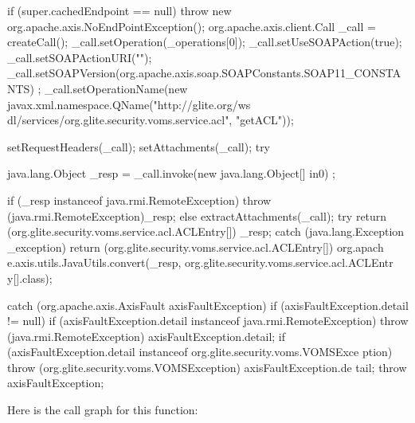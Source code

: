 \begin{DoxyCode}
                                                                                 
                                                                                   {
        if (super.cachedEndpoint == null) {
            throw new org.apache.axis.NoEndPointException();
        }
        org.apache.axis.client.Call _call = createCall();
        _call.setOperation(_operations[0]);
        _call.setUseSOAPAction(true);
        _call.setSOAPActionURI("");
        _call.setSOAPVersion(org.apache.axis.soap.SOAPConstants.SOAP11_CONSTANTS)
      ;
        _call.setOperationName(new javax.xml.namespace.QName("http://glite.org/ws
      dl/services/org.glite.security.voms.service.acl", "getACL"));

        setRequestHeaders(_call);
        setAttachments(_call);
 try {        java.lang.Object _resp = _call.invoke(new java.lang.Object[] {in0})
      ;

        if (_resp instanceof java.rmi.RemoteException) {
            throw (java.rmi.RemoteException)_resp;
        }
        else {
            extractAttachments(_call);
            try {
                return (org.glite.security.voms.service.acl.ACLEntry[]) _resp;
            } catch (java.lang.Exception _exception) {
                return (org.glite.security.voms.service.acl.ACLEntry[]) org.apach
      e.axis.utils.JavaUtils.convert(_resp, org.glite.security.voms.service.acl.ACLEntr
      y[].class);
            }
        }
  } catch (org.apache.axis.AxisFault axisFaultException) {
    if (axisFaultException.detail != null) {
        if (axisFaultException.detail instanceof java.rmi.RemoteException) {
              throw (java.rmi.RemoteException) axisFaultException.detail;
         }
        if (axisFaultException.detail instanceof org.glite.security.voms.VOMSExce
      ption) {
              throw (org.glite.security.voms.VOMSException) axisFaultException.de
      tail;
         }
   }
  throw axisFaultException;
}
    }
\end{DoxyCode}


Here is the call graph for this function:


